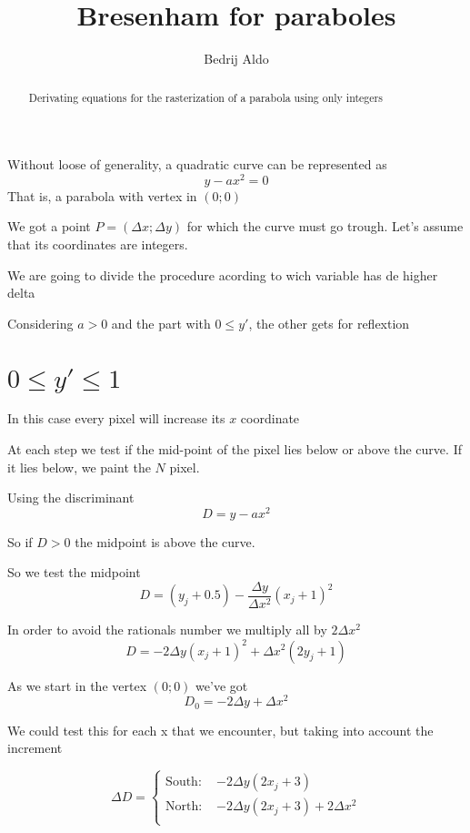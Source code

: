 \documentclass[a4paper]{article}
\title{Bresenham for paraboles}
\author{Bedrij Aldo}
\date{}
\begin{document}
	\maketitle

	\begin{abstract}
		Derivating equations for the rasterization of a parabola
		using only integers
	\end{abstract}

	Without loose of generality, a quadratic curve can be represented as 
	\[ y - a x^2 = 0 \]
	That is, a parabola with vertex in $(0;0)$

	We got a point $P = (\Delta x; \Delta y)$ for which the curve must go trough.
	Let's assume that its coordinates are integers.

	We are going to divide the procedure acording to wich variable has de higher delta

	Considering $a>0$ and the part with $ 0 \leq y' $, the other gets for
	reflextion

	\section{ $ 0 \leq y' \leq 1 $ } 
		In this case every pixel will increase its $x$ coordinate

		At each step we test if the mid-point of the pixel lies below or above the curve.
		If it lies below, we paint the $N$ pixel.

		Using the discriminant 
		\[ D = y - a x^2 \]

		So if $D>0$ the midpoint is above the curve.

		So we test the midpoint
		\[ D = (y_j+0.5) - \frac{\Delta y}{\Delta x^2} (x_j+1)^2\]


		In order to avoid the rationals number we multiply all by $2 \Delta x^2$
		\[ D = -2 \Delta y (x_j+1)^2 + \Delta x^2 (2 y_j+1) \]

		As we start in the vertex $(0;0)$ we've got
		\[ D_0 = -2 \Delta y + \Delta x^2 \]

		We could test this for each x that we encounter, but taking into account the increment

		\[ \Delta D = \left\{
			\begin{array}{ll}
				\mbox{South: } & -2\Delta y (2x_j + 3) \\
				\mbox{North: } & -2\Delta y (2x_j + 3) + 2 \Delta x^2 \\
			\end{array}
			\right.
		\]
\end{document}
